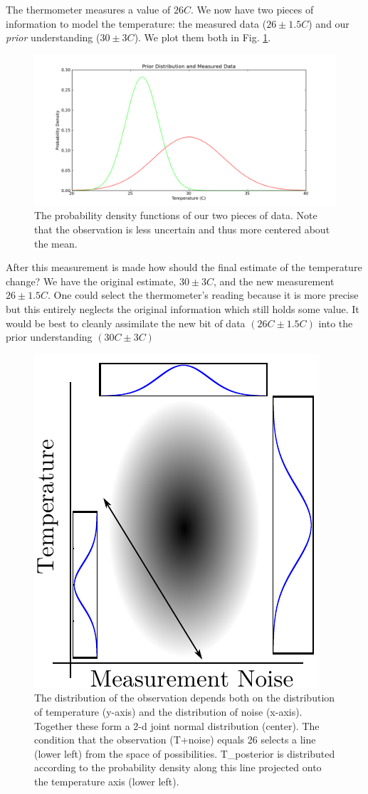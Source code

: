 The thermometer measures a value of $26C$. We now have two pieces of
information to model the temperature: the measured data ($26\pm1.5C$) and our \textit{prior}
understanding ($30\pm3C$). We plot them both in Fig. \ref{fig:DA_data}.

\begin{figure}[ht]
\vspace{-0pt}
\centering
\includegraphics[width=.7\textwidth]{images/data.png}
\vspace{-0pt}
\caption{The probability density functions of our two pieces of data. Note that the observation is less uncertain and thus more centered about the mean.}
\label{fig:DA_data}
\vspace{00pt}
\end{figure}

After this measurement is made how should the final estimate of the temperature change? We have the original estimate, $30 \pm 3C$, and the new measurement $26 \pm 1.5C$. One could select the thermometer's reading because it is more precise but this entirely neglects the original information which still holds some value. It would be best to cleanly assimilate the new bit of data $(26C \pm 1.5C)$ into the prior understanding $(30C \pm 3C)$

\begin{figure}[ht]
\vspace{-0pt}
\centering
\includegraphics[width=.3\textwidth]{images/temperature_given}
\vspace{-0pt}
\caption{The distribution of the observation depends both on the distribution of temperature (y-axis) and the distribution of noise (x-axis). Together these form a 2-d joint normal distribution (center). The condition that the observation (T+noise) equals 26 selects a line (lower left) from the space of possibilities. T\_posterior is distributed according to the probability density along this line projected onto the temperature axis (lower left).}
\label{fig:temperature_given}
\vspace{00pt}
\end{figure}

